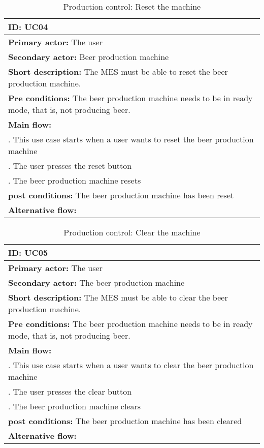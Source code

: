 \begin{table}[ht]
    \begin{tabularx}{\textwidth}{|>{\RaggedRight}X|}
        \hline
        \textbf{ID:} UC04  \\
        \hline
        \textbf{Primary actor:} The user \\
        \hline
        \textbf{Secondary actor:} Beer production machine \\
        \hline
        \textbf{Short description:} The MES must be able to reset the beer
        production machine. \\
        \hline
        \textbf{Pre conditions:} The beer production machine needs to be in
        ready mode, that is, not producing beer. \\
        \hline
        \textbf{Main flow:} \\
        	1. This use case starts when a user wants to reset the beer
        	production machine \\
        	2. The user presses the reset button \\
			3. The beer production machine resets \\
		\hline
        \textbf{post conditions:} The beer production machine has been reset \\
        \hline
        \textbf{Alternative flow:} \\
        \hline
    \end{tabularx}
    \caption{Production control: Reset the machine}
    \label{table:usecase_reset}
\end{table}

\begin{table}[ht]
    \begin{tabularx}{\textwidth}{|>{\RaggedRight}X|}
        \hline
        \textbf{ID:} UC05  \\
        \hline
        \textbf{Primary actor:} The user \\
        \hline
        \textbf{Secondary actor:} The beer production machine \\
        \hline
        \textbf{Short description:} The MES must be able to clear the beer
        production machine. \\
        \hline
        \textbf{Pre conditions:} The beer production machine needs to be in
        ready mode, that is, not producing beer. \\
        \hline
        \textbf{Main flow:} \\
        	1. This use case starts when a user wants to clear the beer
        	production machine \\
        	2. The user presses the clear button \\
			3. The beer production machine clears \\
		\hline
        \textbf{post conditions:} The beer production machine has been cleared \\
        \hline
        \textbf{Alternative flow:} \\
        \hline
    \end{tabularx}
    \caption{Production control: Clear the machine}
    \label{table:usecase_clear}
\end{table}

